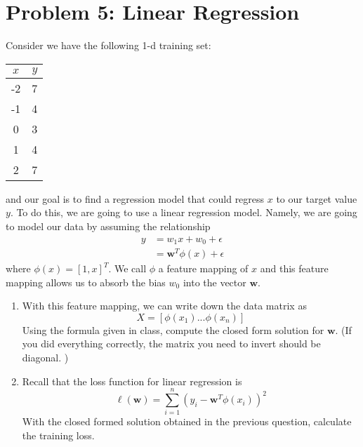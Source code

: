 \documentclass[a4paper]{article}
\begin{document}
\section*{Problem 5: Linear Regression}
Consider we have the following 1-d training set:
\begin{center}
	
	\begin{tabular}{|c|c|}
		\hline
		$x$ & $y$ \\
		\hline
		-2 & 7 \\
		-1 & 4 \\
		0 & 3 \\
		1 & 4 \\
		2 & 7 \\
		\hline
	\end{tabular}
\end{center}
and our goal is to find a regression model that could regress $x$ to our target value $y$. To do this, we are going to use a linear regression model. Namely, we are going to model our data by assuming the relationship 
\begin{align*}
y &= w_1x + w_0 + \epsilon \\
&= \mathbf{w}^T\phi(x) + \epsilon
\end{align*}
where $\phi(x) = [1, x]^T$. We call $\phi$ a feature mapping of $x$ and this feature mapping allows us to absorb the bias $w_0$ into the vector $\mathbf{w}$. 
\begin{enumerate}
	\item With this feature mapping, we can write down the data matrix as 
	$$X = [\phi(x_1) ... \phi(x_n)]$$
	Using the formula given in class, compute the closed form solution for $\mathbf{w}$. (If you did everything correctly, the matrix you need to invert should be diagonal. )
	\item Recall that the loss function for linear regression is 
	$$\ell(\mathbf{w}) = \sum_{i = 1}^{n} (y_i - \mathbf{w}^T \phi(x_i))^2$$
	With the closed formed solution obtained in the previous question, calculate the training loss. 
\end{enumerate}
\end{document}
